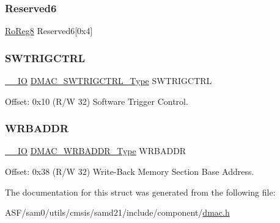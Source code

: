 \mbox{\label{struct_dmac_a90ebeceec1a70581f0fc4da2e250e4a6}} 
\subsubsection{\texorpdfstring{Reserved6}{Reserved6}}
{\footnotesize\ttfamily \mbox{\hyperlink{group___s_a_m_d21_e15_a__definitions_ga0d957f1433aaf5d70e4dc2b68288442d}{Ro\+Reg8}} Reserved6\mbox{[}0x4\mbox{]}}

\mbox{\label{struct_dmac_a3e1671940da05ad5800230cf398310d0}} 
\subsubsection{\texorpdfstring{SWTRIGCTRL}{SWTRIGCTRL}}
{\footnotesize\ttfamily \mbox{\hyperlink{core__cm0plus_8h_aec43007d9998a0a0e01faede4133d6be}{\+\_\+\+\_\+\+IO}} \mbox{\hyperlink{union_d_m_a_c___s_w_t_r_i_g_c_t_r_l___type}{D\+M\+A\+C\+\_\+\+S\+W\+T\+R\+I\+G\+C\+T\+R\+L\+\_\+\+Type}} S\+W\+T\+R\+I\+G\+C\+T\+RL}



Offset\+: 0x10 (R/W 32) Software Trigger Control. 

\mbox{\label{struct_dmac_ae67c9b5dfcbbc13be0738813e8cf1db5}} 
\subsubsection{\texorpdfstring{WRBADDR}{WRBADDR}}
{\footnotesize\ttfamily \mbox{\hyperlink{core__cm0plus_8h_aec43007d9998a0a0e01faede4133d6be}{\+\_\+\+\_\+\+IO}} \mbox{\hyperlink{union_d_m_a_c___w_r_b_a_d_d_r___type}{D\+M\+A\+C\+\_\+\+W\+R\+B\+A\+D\+D\+R\+\_\+\+Type}} W\+R\+B\+A\+D\+DR}



Offset\+: 0x38 (R/W 32) Write-\/\+Back Memory Section Base Address. 



The documentation for this struct was generated from the following file\+:\begin{DoxyCompactItemize}
\item 
A\+S\+F/sam0/utils/cmsis/samd21/include/component/\mbox{\hyperlink{component_2dmac_8h}{dmac.\+h}}\end{DoxyCompactItemize}

